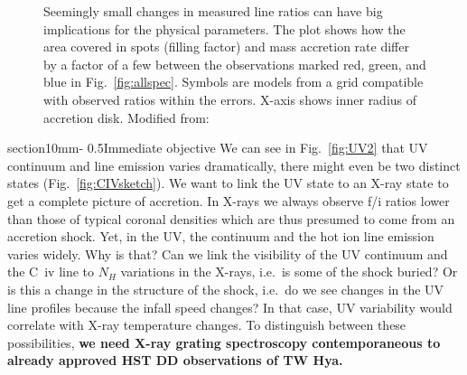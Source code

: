 \documentclass[letterpaper,11pt,twocolumn]{article}
\makeatletter
\renewcommand{\section}{\@startsection%
{section}{1}{0mm}{-\baselineskip}%
{0.5\baselineskip}{\normalfont\Large\bfseries}}%
\makeatother
\begin{document}
\begin{figure}[h!]
\centering
{}
\caption{Seemingly small changes in measured line ratios can have big
  implications for the physical parameters. The plot shows how the
  area covered in spots (filling factor) and mass accretion rate
  differ by a factor of a few between the observations marked red,
  green, and blue in Fig.~\ref{fig:allspec}. Symbols are models from a
  grid compatible with observed ratios within the errors. X-axis shows
  inner radius of accretion disk. Modified from:
\label{fig:Brickhouse_3} }
\end{figure}



\section{Immediate objective}
We can see in Fig.~\ref{fig:UV2} that UV continuum and line emission varies dramatically, there might even be two distinct states (Fig.~\ref{fig:CIVsketch}). We want to link the UV state to an X-ray state to get a complete picture of accretion. In X-rays we always observe f/i ratios lower than those of typical coronal densities which are thus presumed to come from an accretion shock. Yet, in the UV, the continuum and the hot ion line emission varies widely. Why is that? Can we link the visibility of the UV continuum and the C~{\sc iv} line to $N_H$ variations in the X-rays, i.e.\ is some of the shock buried? Or is this a change in the structure of the shock, i.e.\ do we see changes in the UV line profiles because the infall speed changes? In that case, UV variability would correlate with X-ray temperature changes.
To distinguish between these possibilities, \textbf{we need X-ray grating spectroscopy contemporaneous to already approved HST DD observations of TW Hya.}
\end{document}
